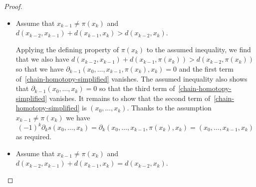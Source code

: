\documentclass[a4paper, 11 pt, oneside, reqno]{amsart}
\numberwithin{lemma}{section}
\theoremstyle{definition}
\begin{document}
\begin{proof}
\begin{itemize}
        Here we see immediately that  
        the first two terms of~\eqref{chain-homotopy-simplified} 
        vanish by the definition of $s$.
        For the third term, we have
        \begin{align*}
            (-1)^{k-1}s\partial_{k-1}(x_0,\ldots,x_k)
            &=
            (-1)^{k-1}s(x_0,\ldots,x_{k-2},x_k)
            \\
            &=
            (x_0,\ldots,x_{k-2},\pi(x_k),x_k)
            \\
            &=
            (x_0,\ldots,x_k)
        \end{align*}
        as required.
        The first of these equations holds because 
        $d(x_{k-2},x_{k-1})+d(x_{k-1},x_k) = d(x_{k-2},x_k)$
        by the defining property of $\pi(x_k)$,
        and the second holds since  $x_{k-2}\neq x_{k-1}=\pi(x_k)$.
        
        \item
        Assume that $x_{k-1}\neq \pi(x_k)$
        and
        $d(x_{k-2},x_{k-1})+d(x_{k-1},x_k) > d(x_{k-2},x_k)$.
        
        Applying the defining property of $\pi(x_k)$ to the 
        assumed inequality, we find that we also have 
        $
            d(x_{k-2},x_{k-1})+d(x_{k-1},\pi(x_k))
            > d(x_{k-2},\pi(x_k))
        $
        so that we have $\partial_{k-1}(x_0,\ldots,x_{k-1},\pi(x_k),x_k)=0$
        and the first term of~\eqref{chain-homotopy-simplified}
        vanishes.
        The assumed inequality also shows that 
        $\partial_{k-1}(x_0,\ldots,x_k)=0$
        so that the third term 
        of~\eqref{chain-homotopy-simplified} vanishes.
        It remains to show that the second term 
        of~\eqref{chain-homotopy-simplified} is 
        $(x_0,\ldots,x_k)$. 
        Thanks to the assumption $x_{k-1}\neq \pi(x_k)$
        we have
        \[
            (-1)^k \partial_k s(x_0,\ldots,x_k)
            =
            \partial_k (x_0,\ldots,x_{k-1},\pi(x_k),x_k)
            =
            (x_0,\ldots,x_{k-1},x_k)
        \]
        as required.
        
        \item
        Assume that 
        $x_{k-1}\neq \pi(x_k)$
        and 
        $d(x_{k-2},x_{k-1})+d(x_{k-1},x_k) = d(x_{k-2},x_k)$.
        

\end{itemize}
\end{proof}
\end{document}
